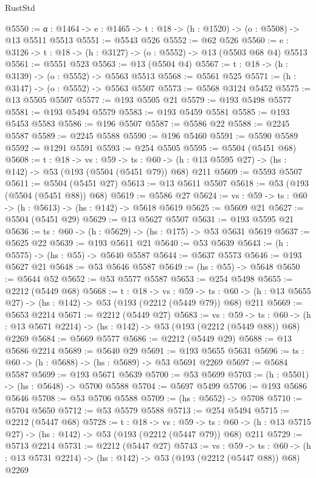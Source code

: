 \begin{lexlean}{RustStd}
\begin{coremodule}
@5550 := {α : @1464} -> {e : @1465} -> {t : @18} -> (h : @1520) -> (o : @5508) -> @13 @5511 @5513
@5551 := @5543 @526
@5552 := @62 @526
@5560 := {e : @3126} -> {t : @18} -> (h : @3127) -> (o : @5552) -> @13 (@5503 @68 @4) @5513
@5561 := @5551 @523
@5563 := @13 (@5504 @4)
@5567 := {t : @18} -> (h : @3139) -> (o : @5552) -> @5563 @5513
@5568 := @5561 @525
@5571 := (h : @3147) -> (o : @5552) -> @5563 @5507
@5573 := @5568 @3124 @5452
@5575 := @13 @5505 @5507
@5577 := @193 @5505 @21
@5579 := @193 @5498 @5577
@5581 := @193 @5494 @5579
@5583 := @193 @5459 @5581
@5585 := @193 @5453 @5583
@5586 := @196 @5507
@5587 := @5586 @22
@5588 := @2245 @5587
@5589 := @2245 @5588
@5590 := @196 @5460
@5591 := @5590 @5589
@5592 := @1291 @5591
@5593 := @254 @5505
@5595 := @5504 (@5451 @68)
@5608 := {t : @18} ->
  {vs : @59} ->
  {ts : @60} -> (h : @13 @5595 @27) -> (hs : @142) -> @53 (@193 (@5504 (@5451 @79)) @68) @211
@5609 := @5593 @5507
@5611 := @5504 (@5451 @27)
@5613 := @13 @5611 @5507
@5618 := @53 (@193 (@5504 (@5451 @88)) @68)
@5619 := @5586 @27
@5624 := {vs : @59} -> {ts : @60} -> (h : @5613) -> (hs : @142) -> @5618 @5619
@5625 := @5609 @21
@5627 := @5504 (@5451 @29)
@5629 := @13 @5627 @5507
@5631 := @193 @5595 @21
@5636 := {ts : @60} -> (h : @5629) -> (hs : @175) -> @53 @5631 @5619
@5637 := @5625 @22
@5639 := @193 @5611 @21
@5640 := @53 @5639
@5643 := (h : @5575) -> (hs : @55) -> @5640 @5587
@5644 := @5637 @5573
@5646 := @193 @5627 @21
@5648 := @53 @5646 @5587
@5649 := (hs : @55) -> @5648
@5650 := @5644 @52
@5652 := @53 @5577 @5587
@5653 := @254 @5498
@5655 := @2212 (@5449 @68)
@5668 := {t : @18} ->
  {vs : @59} ->
  {ts : @60} -> (h : @13 @5655 @27) -> (hs : @142) -> @53 (@193 (@2212 (@5449 @79)) @68) @211
@5669 := @5653 @2214
@5671 := @2212 (@5449 @27)
@5683 := {vs : @59} ->
  {ts : @60} -> (h : @13 @5671 @2214) -> (hs : @142) -> @53 (@193 (@2212 (@5449 @88)) @68) @2269
@5684 := @5669 @5577
@5686 := @2212 (@5449 @29)
@5688 := @13 @5686 @2214
@5689 := @5640 @29
@5691 := @193 @5655 @5631
@5696 := {ts : @60} -> (h : @5688) -> (hs : @5689) -> @53 @5691 @2269
@5697 := @5684 @5587
@5699 := @193 @5671 @5639
@5700 := @53 @5699
@5703 := (h : @5501) -> (hs : @5648) -> @5700 @5588
@5704 := @5697 @5499
@5706 := @193 @5686 @5646
@5708 := @53 @5706 @5588
@5709 := (hs : @5652) -> @5708
@5710 := @5704 @5650
@5712 := @53 @5579 @5588
@5713 := @254 @5494
@5715 := @2212 (@5447 @68)
@5728 := {t : @18} ->
  {vs : @59} ->
  {ts : @60} -> (h : @13 @5715 @27) -> (hs : @142) -> @53 (@193 (@2212 (@5447 @79)) @68) @211
@5729 := @5713 @2214
@5731 := @2212 (@5447 @27)
@5743 := {vs : @59} ->
  {ts : @60} -> (h : @13 @5731 @2214) -> (hs : @142) -> @53 (@193 (@2212 (@5447 @88)) @68) @2269

\end{coremodule}
\end{lexlean}
